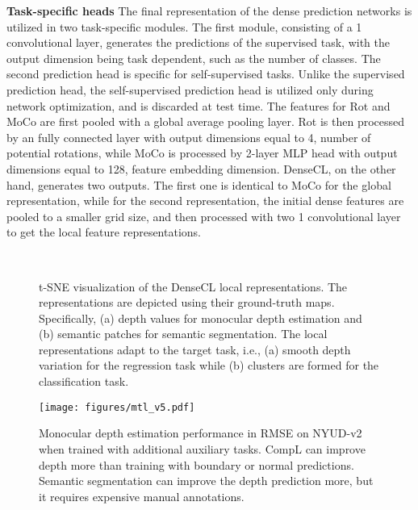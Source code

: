 \documentclass[10pt,twocolumn,letterpaper]{article}
\newcommand{\parsection}[1]{\vspace{1mm}\noindent\textbf{#1 }}
\begin{document}
\parsection{Task-specific heads}
The final representation of the dense prediction networks is utilized in two task-specific modules. 
The first module, consisting of a 1 convolutional layer, generates the predictions of the supervised task, with the output dimension being task dependent, such as the number of classes. 
The second prediction head is specific for self-supervised tasks. 
Unlike the supervised prediction head, the self-supervised prediction head is utilized only during network optimization, and is discarded at test time.
The features for Rot and MoCo are first pooled with a global average pooling layer.
Rot is then processed by an fully connected layer with output dimensions equal to 4, number of potential rotations, while MoCo is processed by 2-layer MLP head with output dimensions equal to 128, feature embedding dimension.
DenseCL, on the other hand, generates two outputs. 
The first one is identical to MoCo for the global representation, while for the second representation, the initial dense features are pooled to a smaller grid size, and then processed with two 1 convolutional layer to get the local feature representations.

\begin{figure*}[ht]
\vspace{-0.1in}
 \centering
    ~\qquad~\qquad
\caption{t-SNE visualization of the DenseCL local representations. 
The representations are depicted using their ground-truth maps. Specifically, (a) depth values for monocular depth estimation and (b) semantic patches for semantic segmentation.
The local representations adapt to the target task, i.e., (a) smooth depth variation for the regression task while (b) clusters are formed for the classification task.} \label{fig:densecl_tsne}
\vspace{-0.1in}
\end{figure*}

\begin{figure}[ht]
 \centering
    \texttt{[image: figures/mtl\_v5.pdf]}
\caption{Monocular depth estimation performance in RMSE on NYUD-v2 when trained with additional auxiliary tasks. CompL can improve depth more than training with boundary or normal predictions. Semantic segmentation can improve the depth prediction more, but it requires expensive manual annotations.}
\label{fig:depth_same_splits}
\vspace{-0.5in}
\end{figure}
\end{document}
